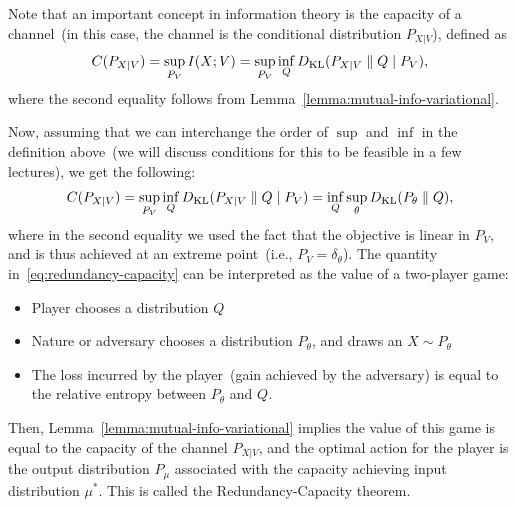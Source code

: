 \documentclass[12pt]{article}
\begin{document}
\begin{remark}
\label{remark:information-variational}
Note that an important concept in information theory is the capacity of a channel~(in this case, the channel is the conditional distribution $P_{X|V}$), defined as 
\begin{align}
C(P_{X|V}) = \sup_{P_V} I(X;V) = \sup_{P_V} \inf_{Q} D_{\text{KL}}(P_{X|V} \parallel Q \mid P_V), 
\end{align}
where the second equality follows from Lemma~\ref{lemma:mutual-info-variational}. 

Now, assuming that we can interchange the order of $\sup$ and $\inf$ in the definition above~(we will discuss conditions for this to be feasible in a few lectures), we get  the following: 
\begin{align}
C(P_{X|V}) =   \sup_{P_V} \inf_{Q} D_{\text{KL}}(P_{X|V} \parallel Q \mid P_V) = \inf_{Q} \sup_{\theta} D_{\text{KL}}(P_\theta \parallel Q),  \label{eq:redundancy-capacity}
\end{align}
where in the second equality we used the fact that the objective is linear in $P_V$, and is thus achieved at an extreme point~(i.e., $P_V = \delta_{\theta}$). The quantity in~\eqref{eq:redundancy-capacity} can be interpreted as the value of a two-player game: 
\begin{itemize}
	\item Player chooses a distribution $Q$
	\item Nature or adversary chooses a distribution $P_\theta$, and draws an $X \sim P_\theta$
	\item The loss incurred by the player~(gain achieved by the adversary) is equal to the relative entropy between $P_\theta$ and $Q$. 
\end{itemize}
Then, Lemma~\ref{lemma:mutual-info-variational} implies the value of this game is equal to the capacity of the channel $P_{X|V}$, and the optimal action for the player is the output distribution $P_\mu$ associated with the capacity achieving input distribution $\mu^*$. This is called the Redundancy-Capacity theorem. 
\end{remark}
\end{document}
